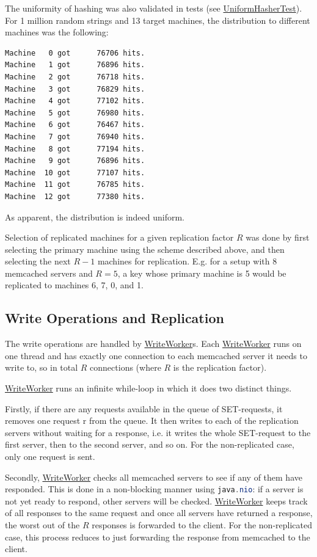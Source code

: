 \documentclass[11pt]{article}
\newcommand{\code}[1]{\lstinline[language=Java]{#1}}
\newcommand{\linkmain}[1]{\href{https://gitlab.inf.ethz.ch/pungast/asl-fall16-project/blob/master/src/main/java/asl/#1.java}{#1}}
\newcommand{\linktest}[1]{\href{https://gitlab.inf.ethz.ch/pungast/asl-fall16-project/blob/master/src/test/java/asl/#1.java}{#1}}
\begin{document}
The uniformity of hashing was also validated in tests (see \linktest{UniformHasherTest}). For 1 million random strings and 13 target machines, the distribution to different machines was the following:

\begin{verbatim}
Machine   0 got      76706 hits.
Machine   1 got      76896 hits.
Machine   2 got      76718 hits.
Machine   3 got      76829 hits.
Machine   4 got      77102 hits.
Machine   5 got      76980 hits.
Machine   6 got      76467 hits.
Machine   7 got      76940 hits.
Machine   8 got      77194 hits.
Machine   9 got      76896 hits.
Machine  10 got      77107 hits.
Machine  11 got      76785 hits.
Machine  12 got      77380 hits.
\end{verbatim}

As apparent, the distribution is indeed uniform.

Selection of replicated machines for a given replication factor $R$ was done by first selecting the primary machine using the scheme described above, and then selecting the next $R-1$ machines for replication. E.g. for a setup with 8 memcached servers and $R=5$, a key whose primary machine is 5 would be replicated to machines 6, 7, 0, and 1.

\subsection{Write Operations and Replication}\label{sec:desc:writes}

The write operations are handled by \linkmain{WriteWorker}s. Each \linkmain{WriteWorker} runs on one thread and has exactly one connection to each memcached server it needs to write to, so in total $R$ connections (where $R$ is the replication factor).

\linkmain{WriteWorker} runs an infinite while-loop in which it does two distinct things.

Firstly, if there are any requests available in the queue of SET-requests, it removes one request r from the queue. It then writes to each of the replication servers without waiting for a response, i.e. it writes the whole SET-request to the first server, then to the second server, and so on. For the non-replicated case, only one request is sent.

Secondly, \linkmain{WriteWorker} checks all memcached servers to see if any of them have responded. This is done in a non-blocking manner using \code{java.nio}: if a server is not yet ready to respond, other servers will be checked. \linkmain{WriteWorker} keeps track of all responses to the same request and once all servers have returned a response, the worst out of the $R$ responses is forwarded to the client. For the non-replicated case, this process reduces to just forwarding the response from memcached to the client.
\end{document}
